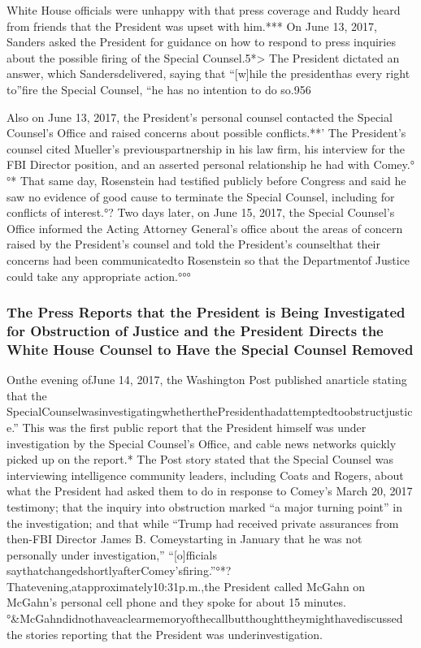 {White House officials were unhappy with that press coverage and Ruddy heard from friends that the President was upset with him.*** On June 13, 2017, Sanders asked the President for guidance on how to respond to press inquiries about the possible firing of the Special Counsel.5*> The President dictated an answer, which Sandersdelivered, saying that “[w]hile the presidenthas every right to”fire the Special Counsel, “he has no intention to do so.956

Also on June 13, 2017, the President’s personal counsel contacted the Special Counsel’s Office and raised concerns about possible conflicts.**’ The President’s counsel cited Mueller’s previouspartnership in his law firm, his interview for the FBI Director position, and an asserted personal relationship he had with Comey.°°* That same day, Rosenstein had testified publicly before Congress and said he saw no evidence of good cause to terminate the Special Counsel, including for conflicts of interest.°? Two days later, on June 15, 2017, the Special Counsel’s Office informed the Acting Attorney General’s office about the areas of concern raised by the President’s counsel and told the President’s counselthat their concerns had been communicatedto Rosenstein so that the Departmentof Justice could take any appropriate action.°°°

\subsubsection{The Press Reports that the President is Being Investigated for Obstruction of Justice and the President Directs the White House Counsel to Have the Special Counsel Removed}

Onthe evening ofJune 14, 2017, the Washington Post published anarticle stating that the SpecialCounselwasinvestigatingwhetherthePresidenthadattemptedtoobstructjustice.” This was the first public report that the President himself was under investigation by the Special Counsel’s Office, and cable news networks quickly picked up on the report.* The Post story stated that the Special Counsel was interviewing intelligence community leaders, including Coats and Rogers, about what the President had asked them to do in response to Comey’s March 20, 2017 testimony; that the inquiry into obstruction marked “a major turning point” in the investigation; and that while “Trump had received private assurances from then-FBI Director James B. Comeystarting in January that he was not personally under investigation,” “[o]fficials saythatchangedshortlyafterComey’sfiring.”°*? Thatevening,atapproximately10:31p.m.,the President called McGahn on McGahn’s personal cell phone and they spoke for about 15 minutes.°&McGahndidnothaveaclearmemoryofthecallbutthoughttheymighthavediscussed the stories reporting that the President was underinvestigation.

}
